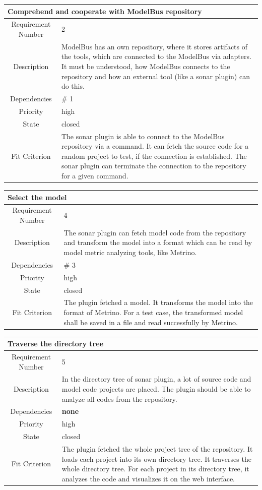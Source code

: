 \begin{longtable}{|c|p{10cm}|}
\hline 
\multicolumn{2}{|l|}{\textbf{Comprehend and cooperate with ModelBus repository}} \\ 
\hline 
Requirement Number & 2 \\ \hline 
Description & ModelBus has an own repository, where it stores artifacts of the tools, which are connected to the ModelBus via adapters. It must be understood, how ModelBus connects to the repository and how an external tool (like a sonar plugin) can do this. \\ \hline 
Dependencies & \# 1 \\ \hline 
Priority & high \\ \hline 
State & closed \\ \hline 
Fit Criterion & The sonar plugin is able to connect to the ModelBus repository via a command. It can fetch the source code for a random project to test, if the connection is established. The sonar plugin can terminate the connection to the repository for a given command. \\ \hline 
\end{longtable}

\begin{longtable}{|c|p{10cm}|}
\hline 
\multicolumn{2}{|l|}{\textbf{Select the model}} \\ 
\hline 
Requirement Number & 4 \\ \hline 
Description & The sonar plugin can fetch model code from the repository and transform the model into a format which can be read by model metric analyzing tools, like Metrino. \\ \hline 
Dependencies & \# 3 \\ \hline 
Priority & high \\ \hline 
State & closed \\ \hline 
Fit Criterion & The plugin fetched a model. It transforms the model into the format of Metrino. For a test case, the transformed model shall be saved in a file and read successfully by Metrino. \\ \hline
\end{longtable}

\begin{longtable}{|c|p{10cm}|}
\hline 
\multicolumn{2}{|l|}{\textbf{Traverse the directory tree}} \\ 
\hline 
Requirement Number & 5 \\ \hline 
Description & In the directory tree of sonar plugin, a lot of source code and model code projects are placed. The plugin should be able to analyze all codes from the repository. \\ \hline 
Dependencies & \textbf{none} \\ \hline 
Priority & high \\ \hline 
State & closed \\ \hline 
Fit Criterion & The plugin fetched the whole project tree of the repository. It loads each project into its own directory tree. It traverses the whole directory tree. For each project in its directory tree, it analyzes the code and visualizes it on the web interface. \\ \hline
\end{longtable}

